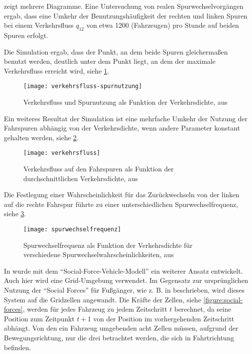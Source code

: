 \cite{multi-lane} zeigt mehrere Diagramme. Eine Untersuchung von realen Spurwechselvorgängen ergab, dass eine Umkehr der Benutzungshäufigkeit der rechten und linken Spuren bei einem Verkehrsfluss $q_{12}$ von etwa 1200 (Fahrzeugen) pro Stunde auf beiden Spuren erfolgt.

Die Simulation ergab, dass der Punkt, an dem beide Spuren gleichermaßen benutzt werden, deutlich unter dem Punkt liegt, an dem der maximale Verkehrsfluss erreicht wird, siehe \cref{figure:verkehrsfluss-spurnutzung}.

\begin{figure}[hptb]
 \centering
 \texttt{[image: verkehrsfluss-spurnutzung]}
 \caption[Verkehrsfluss und Spurnutzung als Funktion der Verkehrsdichte]{Verkehrsfluss und Spurnutzung als Funktion der Verkehrsdichte, aus \cite{multi-lane}}
 \label{figure:verkehrsfluss-spurnutzung}
\end{figure}

Ein weiteres Resultat der Simulation ist eine mehrfache Umkehr der Nutzung der Fahrspuren abhängig von der Verkehrsdichte, wenn andere Parameter konstant gehalten werden, siehe \cref{figure:verkehrsfluss}.

\begin{figure}[hptb]
 \centering
 \texttt{[image: verkehrsfluss]}
 \caption[Verkehrsfluss als Funktion der durchschnittlichen Verkehrsdichte]{Verkehrsfluss auf den Fahrspuren als Funktion der durchschnittlichen Verkehrsdichte, aus \cite{multi-lane}}
 \label{figure:verkehrsfluss}
\end{figure}

Die Festlegung einer Wahrscheinlichkeit für das Zurückwechseln von der linken auf die rechte Fahrspur führte zu einer unterschiedlichen Spurwechselfrequenz, siehe \cref{figure:spurwechselfrequenz}.

\begin{figure}[hptb]
 \centering
 \texttt{[image: spurwechselfrequenz]}
 \caption[Spurwechselfrequenz als Funktion der Verkehrsdichte]{Spurwechselfrequenz als Funktion der Verkehrsdichte für verschiedene Spurwechselwahrscheinlichkeiten, aus \cite{multi-lane}}
 \label{figure:spurwechselfrequenz}
\end{figure}

\pagebreak
In \cite{dat-ba} wurde mit dem \enquote{Social-Force-Vehicle-Modell} ein weiterer Ansatz entwickelt.
Auch hier wird eine Grid-Umgebung verwendet.
Im Gegensatz zur ursprünglichen Nutzung der \enquote{Social Forces} für Fußgänger, wie z. B. in \cite{soc-for} beschrieben, wird dieses System auf die Gridzellen angewandt. Die Kräfte der Zellen, siehe \cref{figure:social-forces}, werden für jedes Fahrzeug zu jedem Zeitschritt $t$ berechnet, da seine Position zum Zeitpunkt $t + 1$ von der Position im vorhergehenden Zeitschritt abhängt.
Von den ein Fahrzeug umgebenden acht Zellen müssen, aufgrund der Bewegungsrichtung, nur die drei betrachtet werden, die sich in Fahrtrichtung befinden.

